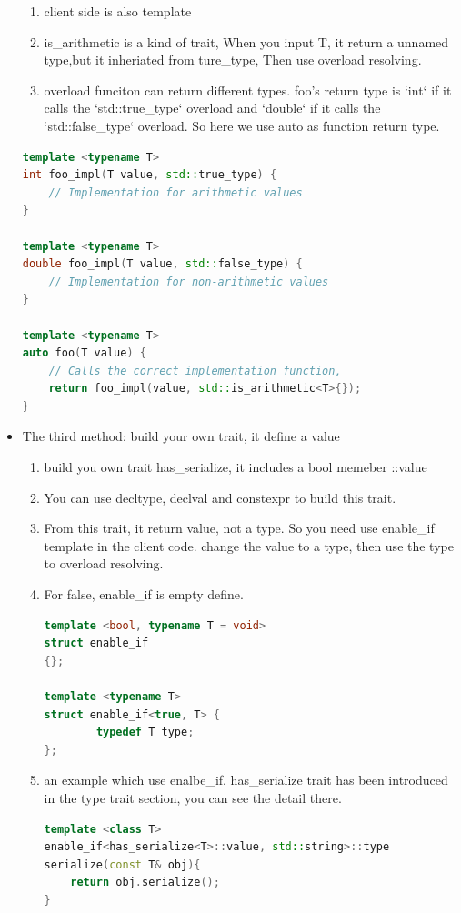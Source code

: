 \documentclass[a4paper,11pt,twoside]{book}
\begin{document}
\begin{itemize}
\begin{enumerate}
		\item client side is also template
		\item is\_arithmetic is a kind of trait, When you input T, it return a unnamed type,but it inheriated from ture\_type, Then use overload resolving.
		\item overload funciton can return different types. foo's return type is `int` if it calls the `std::true\_type` overload and `double` if it calls the `std::false\_type` overload. So here we use auto as function return type.
	\end{enumerate}
\begin{lstlisting}[frame=single, language=c++]
template <typename T>
int foo_impl(T value, std::true_type) {
	// Implementation for arithmetic values
}
	
template <typename T>
double foo_impl(T value, std::false_type) {
	// Implementation for non-arithmetic values
}
	
template <typename T>
auto foo(T value) {
	// Calls the correct implementation function, 
	return foo_impl(value, std::is_arithmetic<T>{});
}
	\end{lstlisting}
	
	\item The third method: build your own trait, it define a value
	\begin{enumerate}
		\item build you own trait has\_serialize, it includes a bool memeber ::value
		
		\item You can use decltype, declval and constexpr to build this trait. 
		\item From this trait, it return value, not a type. So you need use enable\_if template in the client code. change the value to a type, then use the type to overload resolving.
		
		\item For false, enable\_if is empty define.
\begin{lstlisting}[frame=single, language=c++]
template <bool, typename T = void>
struct enable_if
{};
		
template <typename T>
struct enable_if<true, T> {
		typedef T type;
};
\end{lstlisting}

\item an example which use enalbe\_if. has\_serialize trait has been introduced in the type trait section, you can see the detail there. 

\begin{lstlisting}[frame=single, language=c++]
template <class T>
enable_if<has_serialize<T>::value, std::string>::type
serialize(const T& obj){
	return obj.serialize();
}


\end{lstlisting}
\end{enumerate}
\end{itemize}
\end{document}

